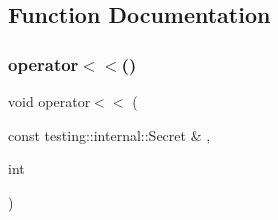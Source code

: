 \subsection{Function Documentation}
\mbox{\label{gtest-message_8h_ae8f0c86e5c506587b62315e24a918563}} 
\subsubsection{\texorpdfstring{operator$<$$<$()}{operator<<()}}
{\footnotesize\ttfamily void operator$<$$<$ (\begin{DoxyParamCaption}\item[{const testing\+::internal\+::\+Secret \&}]{,  }\item[{int}]{ }\end{DoxyParamCaption})}

